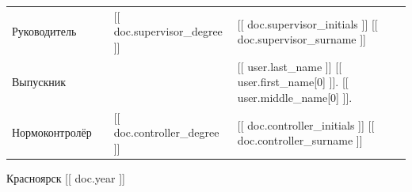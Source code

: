 \begin{titlepage}
\noindent
\begin{tabular}{@{} p{} >{\centering\arraybackslash} p{} p{} p{} @{}}
    Руководитель & \rule{3.5cm}{.1pt} & [[ doc.supervisor_degree ]] & [[ doc.supervisor_initials ]] [[ doc.supervisor_surname ]] \\
    Выпускник & \rule{3.5cm}{.1pt} & & [[ user.last_name ]] [[ user.first_name[0] ]]. [[ user.middle_name[0] ]]. \\
    Нормоконтролёр & \rule{3.5cm}{.1pt} & [[ doc.controller_degree ]] & [[ doc.controller_initials ]] [[ doc.controller_surname ]] \\
\end{tabular}

\vfill
\begin{center}Красноярск [[ doc.year ]]\end{center}
\end{titlepage}
\restoregeometry